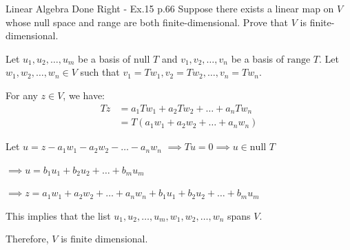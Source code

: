 \begin{problem}{}{}{Linear Algebra Done Right - Ex.15 p.66}
Suppose there exists a linear map on $V$ whose null space and range
are both finite-dimensional. Prove that $V$ is finite-dimensional.
\end{problem}

\begin{solution}
    Let $u_1, u_2, \dots, u_m$ be a basis of $\text{null } T$ and $v_1, v_2, \dots, v_n$
    be a basis of $\text{range } T$. Let $w_1, w_2, \dots, w_n \in V$ such that
    $v_1 = Tw_1, v_2 = Tw_2, \dots, v_n = Tw_n$.

    For any $z \in V$, we have:
    \begin{align*}
        Tz & = a_1 Tw_1 + a_2 Tw_2 + \dots + a_n Tw_n \\
           & = T(a_1 w_1 + a_2 w_2 + \dots + a_n w_n)
    \end{align*}

    Let $u = z - a_1 w_1 - a_2 w_2 - \dots - a_n w_n$
    $\implies Tu = 0 \implies u \in \text{null } T$

    $\implies u = b_1 u_1 + b_2 u_2 + \dots + b_m u_m$

    $\implies z = a_1 w_1 + a_2 w_2 + \dots + a_n w_n + b_1 u_1 + b_2 u_2 + \dots + b_m u_m$

    This implies that the list $u_1, u_2, \dots, u_m, w_1, w_2, \dots, w_n$ spans $V$.

    Therefore, $V$ is finite dimensional.
\end{solution}